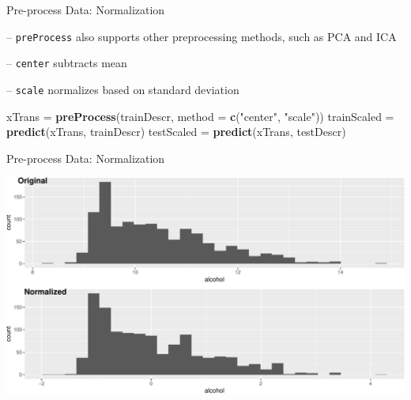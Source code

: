 \documentclass[ignorenonframetext,]{beamer}
\newenvironment{Shaded}{\begin{snugshade}}{\end{snugshade}}
\newcommand{\KeywordTok}[1]{\textcolor[rgb]{0.13,0.29,0.53}{\textbf{#1}}}
\newcommand{\DataTypeTok}[1]{\textcolor[rgb]{0.13,0.29,0.53}{#1}}
\newcommand{\StringTok}[1]{\textcolor[rgb]{0.31,0.60,0.02}{#1}}
\newcommand{\NormalTok}[1]{#1}
\begin{document}
\begin{frame}[fragile]{Pre-process Data: Normalization}

-- \texttt{preProcess} also supports other preprocessing methods, such
as PCA and ICA

-- \texttt{center} subtracts mean

-- \texttt{scale} normalizes based on standard deviation

\begin{Shaded}
\begin{Highlighting}[]
\NormalTok{xTrans =}\StringTok{ }\KeywordTok{preProcess}\NormalTok{(trainDescr, }\DataTypeTok{method =} \KeywordTok{c}\NormalTok{(}\StringTok{"center"}\NormalTok{, }\StringTok{"scale"}\NormalTok{)) }
\NormalTok{trainScaled =}\StringTok{ }\KeywordTok{predict}\NormalTok{(xTrans, trainDescr)}
\NormalTok{testScaled =}\StringTok{ }\KeywordTok{predict}\NormalTok{(xTrans, testDescr)}
\end{Highlighting}
\end{Shaded}

\end{frame}

\begin{frame}{Pre-process Data: Normalization}

\includegraphics{ML_with_caret_files/figure-beamer/pre-process-plot-1.pdf}

\end{frame}
\end{document}

